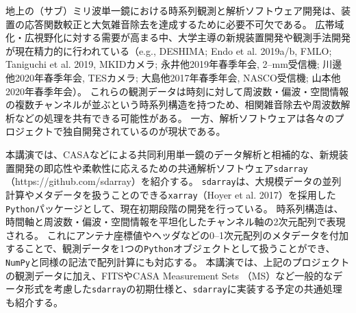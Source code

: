 \documentclass[ja]{2020a}
\begin{document}

地上の（サブ）ミリ波単一鏡における時系列観測と解析ソフトウェア開発は、装置の応答関数較正と大気雑音除去を達成するために必要不可欠である。
広帯域化・広視野化に対する需要が高まる中、大学主導の新規装置開発や観測手法開発が現在精力的に行われている（e.g., DESHIMA; Endo et al. 2019a/b, FMLO; Taniguchi et al. 2019, MKIDカメラ; 永井他2019年春季年会, 2--mm受信機; 川邊他2020年春季年会, TESカメラ; 大島他2017年春季年会, NASCO受信機; 山本他2020年春季年会）。
これらの観測データは時刻に対して周波数・偏波・空間情報の複数チャンネルが並ぶという時系列構造を持つため、相関雑音除去や周波数解析などの処理を共有できる可能性がある。
一方、解析ソフトウェアは各々のプロジェクトで独自開発されているのが現状である。

本講演では、CASAなどによる共同利用単一鏡のデータ解析と相補的な、新規装置開発の即応性や柔軟性に応えるための共通解析ソフトウェア\texttt{sdarray}（https://github.com/sdarray）を紹介する。
\texttt{sdarray}は、大規模データの並列計算やメタデータを扱うことのできる\texttt{xarray}（Hoyer et al. 2017）を採用した\texttt{Python}パッケージとして、現在初期段階の開発を行っている。
時系列構造は、時間軸と周波数・偏波・空間情報を平坦化したチャンネル軸の2次元配列で表現される。
これにアンテナ座標値やヘッダなどの0--1次元配列のメタデータを付加することで、観測データを1つの\texttt{Python}オブジェクトとして扱うことができ、\texttt{NumPy}と同様の記法で配列計算にも対応する。
本講演では、上記のプロジェクトの観測データに加え、FITSやCASA Measurement Sets （MS）など一般的なデータ形式を考慮した\texttt{sdarray}の初期仕様と、\texttt{sdarray}に実装する予定の共通処理も紹介する。

\end{document}
